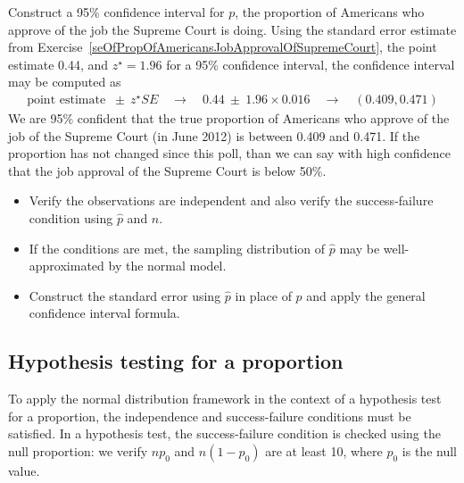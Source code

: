 \begin{example}{Construct a 95\% confidence interval for $p$, the proportion of Americans who approve of the job the Supreme Court is doing.}
Using the standard error estimate from Exercise~\ref{seOfPropOfAmericansJobApprovalOfSupremeCourt}, the point estimate 0.44, and $z^{\star} = 1.96$ for a 95\% confidence interval, the confidence interval may be computed as
\begin{eqnarray*}
\text{point estimate } \ \pm\ z^{\star}SE \quad\to\quad 0.44 \ \pm\ 1.96\times 0.016 \quad\to\quad (0.409, 0.471)
\end{eqnarray*}
We are 95\% confident that the true proportion of Americans who approve of the job of the Supreme Court (in June 2012) is between 0.409 and 0.471. If the proportion has not changed since this poll, than we can say with high confidence that the job approval of the Supreme Court is below 50\%.


\end{example}

\begin{termBox}{\vspace{-1mm}
\begin{itemize}
\setlength{\itemsep}{0mm}
\item Verify the observations are independent and also verify the success-failure condition using $\hat{p}$ and $n$.
\item If the conditions are met, the sampling distribution of $\hat{p}$ may be well-approximated by the normal model.
\item Construct the standard error using $\hat{p}$ in place of $p$ and apply the general confidence interval formula.\vspace{1mm}
\end{itemize}}
\end{termBox}


\subsection{Hypothesis testing for a proportion}
\label{htForPropSection}

To apply the normal distribution framework in the context of a hypothesis test for a proportion, the independence and success-failure conditions must be satisfied. In a hypothesis test, the success-failure condition is checked using the null proportion: we verify $np_0$ and $n(1-p_0)$ are at least 10, where $p_0$ is the null value.

